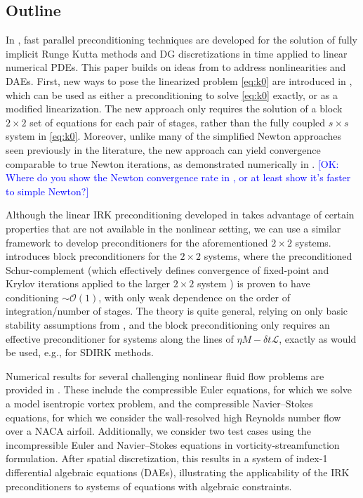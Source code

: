 \documentclass[review]{siamart}
\newcommand{\OK}[1]{\textcolor{blue}{[OK: #1]}}
\begin{document}
\subsection{Outline}\label{sec:intro:outline}

In \cite{irk1}, fast parallel preconditioning techniques are developed for
the solution of fully implicit Runge Kutta methods and DG discretizations
in time applied to linear numerical PDEs. This paper builds on ideas from
\cite{irk1} to address nonlinearities and DAEs. First, new ways to pose the
linearized problem \eqref{eq:k0} are introduced in ,
which can be used as either a preconditioning to solve \eqref{eq:k0} exactly,
or as a modified linearization. The new approach only requires the solution
of a block $2\times 2$ set of equations for each pair of stages, rather than
the fully coupled $s\times s$ system in \eqref{eq:k0}. Moreover, unlike many
of the simplified Newton approaches seen previously in the literature, the
new approach can yield convergence comparable to true Newton iterations, as
demonstrated numerically in .
%
\OK{Where do you show the Newton convergence rate in \Cref{sec:numerics}, or at least show it's faster to simple Newton?}
%

Although the linear IRK preconditioning developed in \cite{irk1} takes
advantage of certain properties that are not available in the nonlinear
setting, we can use a similar framework to develop preconditioners for the
aforementioned $2\times 2$ systems.  introduces block
preconditioners for the $2\times 2$ systems, where the preconditioned
Schur-complement (which effectively defines convergence of fixed-point
and Krylov iterations applied to the larger $2\times 2$ system
\cite{2x2block}) is proven to have conditioning $\sim\mathcal{O}(1)$,
with only weak dependence on the order of integration/number of stages.
The theory is quite general, relying on only basic stability assumptions
from , and the block preconditioning only requires
an effective preconditioner for systems along the lines of
$\eta M - \delta t\mathcal{L}$, exactly as would be used, e.g., for
SDIRK methods.

Numerical results for several challenging nonlinear fluid flow problems are
provided in . These include the compressible Euler equations,
for which we solve a model isentropic vortex problem, and the compressible
Navier--Stokes equations, for which we consider the wall-resolved high Reynolds
number flow over a NACA airfoil. Additionally, we consider two test cases using
the incompressible Euler and Navier--Stokes equations in
vorticity-streamfunction formulation. After spatial discretization, this results
in a system of index-1 differential algebraic equations (DAEs), illustrating the
applicability of the IRK preconditioners to systems of equations with algebraic
constraints.
\end{document}
